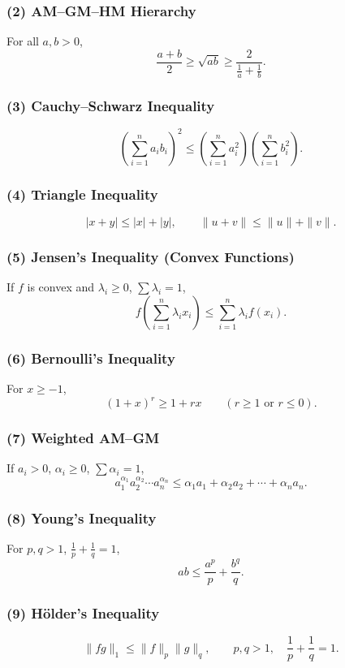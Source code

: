 \documentclass[9pt]{extarticle}
\begin{document}
\subsubsection*{(2) AM--GM--HM Hierarchy}
For all \(a,b>0\),
\[
\frac{a+b}{2} \ge \sqrt{ab} \ge \frac{2}{\tfrac{1}{a}+\tfrac{1}{b}}.
\]

\subsubsection*{(3) Cauchy--Schwarz Inequality}
\[
\left(\sum_{i=1}^n a_i b_i\right)^2
\le
\left(\sum_{i=1}^n a_i^2\right)
\left(\sum_{i=1}^n b_i^2\right).
\]

\subsubsection*{(4) Triangle Inequality}
\[
|x+y|\le |x|+|y|,
\qquad
\|u+v\| \le \|u\| + \|v\|.
\]

\subsubsection*{(5) Jensen's Inequality (Convex Functions)}
If \(f\) is convex and \(\lambda_i \ge 0\), \(\sum \lambda_i = 1\),
\[
f\!\left(\sum_{i=1}^n \lambda_i x_i\right)
\le
\sum_{i=1}^n \lambda_i f(x_i).
\]

\subsubsection*{(6) Bernoulli's Inequality}
For \(x \ge -1\),
\[
(1+x)^r \ge 1 + rx
\qquad (r \ge 1 \text{ or } r \le 0).
\]

\subsubsection*{(7) Weighted AM--GM}
If \(a_i > 0\), \(\alpha_i \ge 0\), \(\sum\alpha_i = 1\),
\[
a_1^{\alpha_1} a_2^{\alpha_2}\cdots a_n^{\alpha_n}
\le
\alpha_1 a_1 + \alpha_2 a_2 + \cdots + \alpha_n a_n.
\]

\subsubsection*{(8) Young's Inequality}
For \(p,q>1\), \(\tfrac{1}{p}+\tfrac{1}{q}=1\),
\[
ab \le \frac{a^p}{p} + \frac{b^q}{q}.
\]

\subsubsection*{(9) Hölder's Inequality}
\[
\|fg\|_1 \le \|f\|_p \|g\|_q,
\qquad
p,q>1,\quad \frac{1}{p}+\frac{1}{q}=1.
\]
\end{document}
